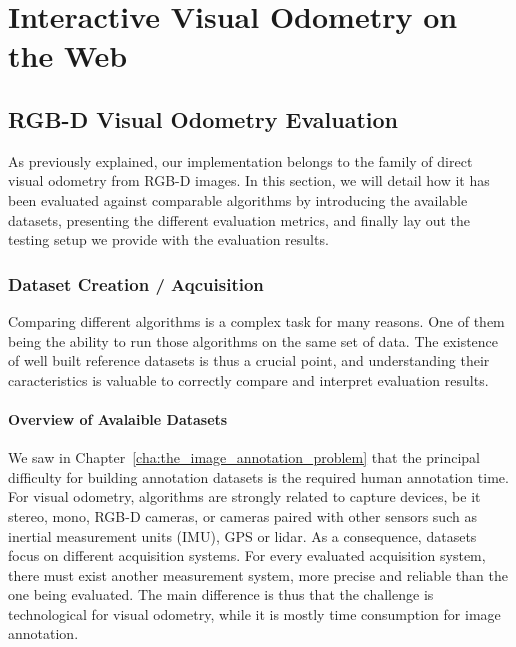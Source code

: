 \chapter{Interactive Visual Odometry on the Web}%
\label{cha:interactive_vo_on_the_web}

\minitoc%
\clearpage

\section{RGB-D Visual Odometry Evaluation}%
\label{sec:rgbd-vo-evaluation}

As previously explained, our implementation
belongs to the family of direct visual odometry from RGB-D images.
In this section, we will detail how it has been evaluated against
comparable algorithms by introducing the available datasets,
presenting the different evaluation metrics,
and finally lay out the testing setup we provide with the evaluation results.

\subsection{Dataset Creation / Aqcuisition}%
\label{sub:dataset_creation}

Comparing different algorithms is a complex task for many reasons.
One of them being the ability to run those algorithms on the same set of data.
The existence of well built reference datasets is thus a crucial point,
and understanding their caracteristics is valuable to correctly compare and interpret
evaluation results.

\subsubsection{Overview of Avalaible Datasets}%
\label{ssub:datasets_overview}

We saw in Chapter~\ref{cha:the_image_annotation_problem} that the principal
difficulty for building annotation datasets is the required human annotation time.
For visual odometry, algorithms are strongly related to capture devices,
be it stereo, mono, RGB-D cameras, or cameras paired with other sensors
such as inertial measurement units (IMU), GPS or lidar.
As a consequence, datasets focus on different acquisition systems.
For every evaluated acquisition system, there must exist another measurement system,
more precise and reliable than the one being evaluated.
The main difference is thus that
the challenge is technological for visual odometry,
while it is mostly time consumption for image annotation.

